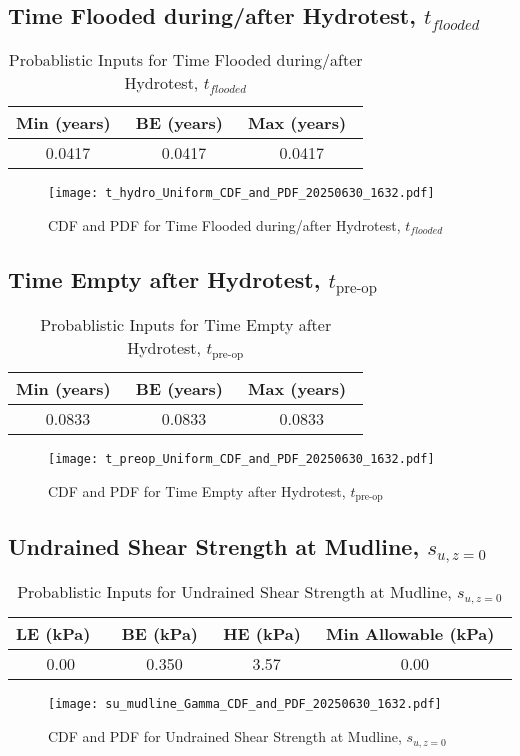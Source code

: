 \documentclass{article}
\begin{document}
\subsection*{Time Flooded during/after Hydrotest, $t_{flooded}$}
\begin{table}[h!]
\centering
\caption{Probablistic Inputs for Time Flooded during/after Hydrotest, $t_{flooded}$}
\begin{tabular}{|c|c|c|}
\hline
Min (years)\ & BE (years)\ & Max (years)\ \\
\hline
0.0417 & 0.0417 & 0.0417 \\
\hline
\end{tabular}
\end{table}
\begin{figure}[h!]
\centering
\texttt{[image: t\_hydro\_Uniform\_CDF\_and\_PDF\_20250630\_1632.pdf]}
\caption{CDF and PDF for Time Flooded during/after Hydrotest, $t_{flooded}$}
\end{figure}
\clearpage
\subsection*{Time Empty after Hydrotest, $t_{\text{pre-op}}$}
\begin{table}[h!]
\centering
\caption{Probablistic Inputs for Time Empty after Hydrotest, $t_{\text{pre-op}}$}
\begin{tabular}{|c|c|c|}
\hline
Min (years)\ & BE (years)\ & Max (years)\ \\
\hline
0.0833 & 0.0833 & 0.0833 \\
\hline
\end{tabular}
\end{table}
\begin{figure}[h!]
\centering
\texttt{[image: t\_preop\_Uniform\_CDF\_and\_PDF\_20250630\_1632.pdf]}
\caption{CDF and PDF for Time Empty after Hydrotest, $t_{\text{pre-op}}$}
\end{figure}
\clearpage
\subsection*{Undrained Shear Strength at Mudline, $s_{{u,z=0}}$}
\begin{table}[h!]
\centering
\caption{Probablistic Inputs for Undrained Shear Strength at Mudline, $s_{{u,z=0}}$}
\begin{tabular}{|c|c|c|c|}
\hline
LE (kPa) \ & BE (kPa)\ & HE (kPa)\ & Min Allowable (kPa)\ \\
\hline
0.00 & 0.350 & 3.57 & 0.00 \\
\hline
\end{tabular}
\end{table}
\begin{figure}[h!]
\centering
\texttt{[image: su\_mudline\_Gamma\_CDF\_and\_PDF\_20250630\_1632.pdf]}
\caption{CDF and PDF for Undrained Shear Strength at Mudline, $s_{{u,z=0}}$}
\end{figure}
\clearpage
\end{document}
